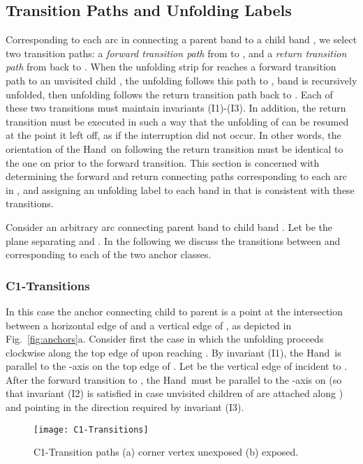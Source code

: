 \documentclass[11pt]{article}
\newcommand\hand{{\sc Hand}}
\begin{document}
\subsection{Transition Paths and Unfolding Labels}
\label{sec:transitions}
Corresponding to each arc in  connecting a parent band  to a child band , we select two transition paths: a \emph{forward transition path} from  to , and a \emph{return transition path} from  back to . When the unfolding strip for  reaches a forward transition path to an unvisited child , the unfolding follows this path to , band  is recursively unfolded, then unfolding follows the return transition path back to . Each of these two transitions must maintain invariants (I1)-(I3). In addition, the return transition must be executed in such a way that the unfolding of  can be resumed at the point it left off, as if the interruption did not occur. In other words, the orientation of the \hand\ on  following the return transition must be identical to the one on  prior to the forward transition.
This section is concerned with determining the forward and return connecting paths corresponding to each arc in , and assigning an unfolding label to each band in  that is consistent with these transitions.

Consider an arbitrary arc  connecting parent band  to child band . Let  be
the plane separating  and . In the following we discuss the transitions between  and  corresponding 
to each of the two anchor classes.

\subsubsection{C1-Transitions}
\label{sec:C1}
In this case the anchor connecting child  to parent  is a point  at the intersection between a horizontal edge of  and a vertical edge of , as depicted in Fig.~\ref{fig:anchors}a. Consider first the case in which the unfolding proceeds clockwise along the top edge of  upon reaching .
By invariant (I1), the \hand\ is parallel to the -axis on the top edge of . Let  be the vertical edge of  incident to . After the forward transition to , the \hand\ must be parallel to the -axis on  (so that invariant (I2) is satisfied in case unvisited children of  are attached along ) and pointing in the direction required by invariant (I3).

\begin{figure}[htpb]
\centering
\texttt{[image: C1-Transitions]}
\caption{C1-Transition paths (a) corner vertex  unexposed (b)  exposed.}
\label{fig:C1-transitions}
\end{figure}
\end{document}
